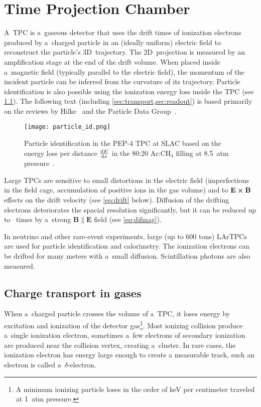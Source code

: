 \chapter{Time Projection Chamber}
\label{sec:tpc}
	A~\acf{TPC} is a~gaseous detector that uses the drift times of ionization electrons produced by a~charged particle in an (ideally uniform) electric field to reconstruct the particle's 3D~trajectory. The 2D~projection is measured by an amplification stage at the end of the drift volume. When placed inside a~magnetic field (typically parallel to the electric field), the momentum of the incident particle can be inferred from the curvature of its trajectory. Particle identification is also possible using the ionization energy loss inside the \ac{TPC} (see \cref{fig:particleid}). The following text (including \cref{sec:transport,sec:readout}) is based primarily on the reviews by Hilke~\cite{TPCs} and the Particle Data Group~\cite{pdg2024}.
	
	\begin{figure}[H]
		\centering
		\texttt{[image: particle\_id.png]}
		\caption{Particle identification in the PEP-4 \ac{TPC} at SLAC based on the energy loss per distance $\dv{E}{x}$ in the 80:20 Ar:CH$_4$ filling at \qty{8.5}{atm} pressure~\cite{particleid}.}
		\label{fig:particleid}
	\end{figure}
	
	Large \acp{TPC} are sensitive to small distortions in the electric field (imperfections in the field cage, accumulation of positive ions in the gas volume) and to $\mathbf{E}\cross\mathbf{B}$ effects on the drift velocity (see \cref{eq:drift} below). Diffusion of the drifting electrons deteriorates the spacial resolution significantly, but it can be reduced up to ~times by a~strong $\mathbf{B}\parallel\mathbf{E}$ field (see \cref{eq:difmag}).
	
	In neutrino and other rare-event experiments, large (up to 600 tons) \acp{LArTPC} are used for particle identification and calorimetry. The ionization electrons can be drifted for many meters with a~small diffusion. Scintillation photons are also measured.
	
	\section{Charge transport in gases}
	\label{sec:transport}
		When a~charged particle crosses the volume of a~\ac{TPC}, it loses energy by excitation and ionization of the detector gas\footnote{A minimum ionizing particle loses in the order of \unit{\keV} per centimeter traveled at \qty{1}{atm} pressure.}. Most ionizing collision produce a~single ionization electron, sometimes a~few electrons of secondary ionization are produced near the collision vertex, creating a~cluster. In rare cases, the ionization electron has energy large enough to create a measurable track, such an electron is called a~$\delta$\nobreakdash-electron.
		
